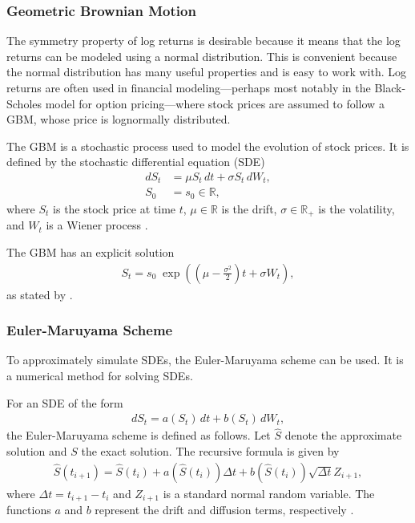 \subsubsection{Geometric Brownian Motion}
The symmetry property of log returns is desirable because it means that the log returns can be modeled using a normal distribution. This is convenient because the normal distribution has many useful properties and is easy to work with. Log returns are often used in financial modeling—perhaps most notably in the Black-Scholes model for option pricing—where stock prices are assumed to follow a \gls{GBM}, whose price is lognormally distributed. 

The \gls{GBM} is a stochastic process used to model the evolution of stock prices. It is defined by the stochastic differential equation (SDE)
\begin{align*}
    dS_t &= \mu S_t \,dt + \sigma S_t \,dW_t, \\
    S_0 &= s_0 \in \mathbb{R},
\end{align*}
where $S_t$ is the stock price at time $t$, $\mu \in \mathbb{R}$ is the drift, $\sigma \in \mathbb{R}_+$ is the volatility, and $W_t$ is a Wiener process \citet[p.~67]{Bjork2019Edition4}.

The \gls{GBM} has an explicit solution
\begin{align*}
    S_t = s_0 \; \exp\left( \left( \mu - \frac{\sigma^2}{2} \right)t + \sigma W_t \right),
\end{align*}
as stated by .

\subsubsection{Euler-Maruyama Scheme}\label{sec:EulerMaruyama}
To approximately simulate \gls{SDE}s, the Euler-Maruyama scheme can be used. It is a numerical method for solving \gls{SDE}s.

For an \gls{SDE} of the form
\begin{align*}
    dS_t = a(S_t)\,dt + b(S_t)\,dW_t,
\end{align*}
the Euler-Maruyama scheme is defined as follows. Let $\hat{S}$ denote the approximate solution and $S$ the exact solution. The recursive formula is given by
\begin{align*}
    \hat{S}(t_{i+1}) = \hat{S}(t_i) + a(\hat{S}(t_i)) \Delta t + b(\hat{S}(t_i)) \sqrt{\Delta t} Z_{i+1},
\end{align*}
where $\Delta t = t_{i+1} - t_i$ and $Z_{i+1}$ is a standard normal random variable. The functions $a$ and $b$ represent the drift and diffusion terms, respectively \citep[pp.~339--340]{glasserman2004monte}.

